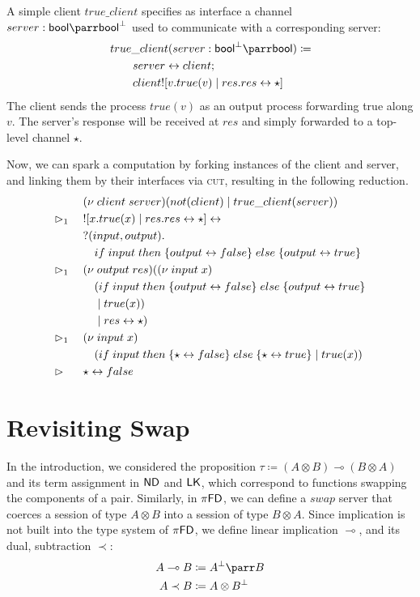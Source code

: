 A simple client $true\_client$ specifies as interface a channel $server : \bool \parr \cobool$
used to communicate with a corresponding server:
\begin{align*}
  &true\_client(server : \cobool \parr \bool) \coloneq \\
  &\qquad \link{server}{client} \seq \\
  &\qquad client ! [v . true(v) \mid res. \link{res}{\star}]
\end{align*}
The client sends the process $true(v)$ as an output process forwarding
true along $v$. The server's response will be received at $res$ and simply
forwarded to a top-level channel $\star$.

Now, we can spark a computation by forking instances of the client and server,
and linking them by their interfaces via \textsc{cut}, resulting in the following
reduction.
{\allowdisplaybreaks
\begin{align*}
  &       &&\; (\nu \;client \;server)(not(client) \mid true\_client(server)) \\
  &\rhd_1 &&\; ! [x.true(x) \mid res.res \leftrightarrow \star] \leftrightarrow \\
  &       &&\; ?(input, output). \\
  &       &&\; \quad if \; input \; then \; \{output \leftrightarrow false\} \; else \; \{output \leftrightarrow true\} \\
  &\rhd_1 &&\; (\nu \; output \; res) ((\nu \; input \; x) \\
  &       &&\; \quad (if \; input \; then \; \{output \leftrightarrow false\} \; else \; \{output \leftrightarrow true\} \\
  &       &&\; \quad \mid true(x)) \\
  &       &&\; \quad \mid res \leftrightarrow \star) \\
  &\rhd_1 &&\; (\nu \; input \; x) \\
  &       &&\; \quad (if \; input \; then \; \{\star \leftrightarrow false\} \; else \; \{\star \leftrightarrow true\} \mid true(x)) \\
  &\rhd   &&\; \star \leftrightarrow false
\end{align*}
}

\section{Revisiting Swap}
In the introduction, we considered the proposition $\tau \coloneq (A \otimes B) \multimap (B \otimes A)$
and its term assignment in $\textsf{ND}$ and $\textsf{LK}$, which correspond to functions swapping
the components of a pair. Similarly, in $\pi\textsf{FD}$, we can define a $swap$ server that coerces a session
of type $A \otimes B$ into a session of type $B \otimes A$. Since implication is not
built into the type system of $\pi\textsf{FD}$, we define linear implication $\multimap$, and its dual, subtraction $\prec$:
\begin{align*}
  A \multimap B &\coloneq A^\bot \parr B \\
  A \prec B     &\coloneq A \otimes B^\bot
\end{align*}

